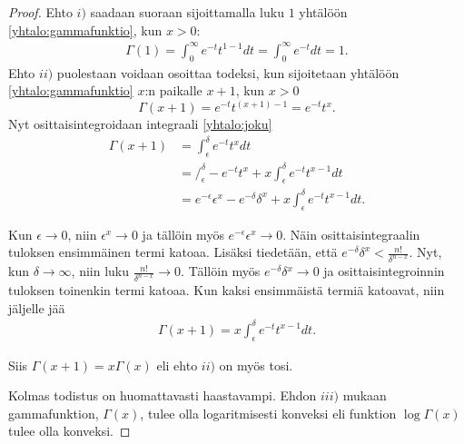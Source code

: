 \documentclass[12pt]{article}
\theoremstyle{definition}
\theoremstyle{plain}
\numberwithin{equation}{section}
\begin{document}
\begin{proof}
Ehto $i)$ saadaan suoraan sijoittamalla luku $1$ yhtälöön \eqref{yhtalo:gammafunktio}, kun $x>0$:
\begin{align*}
    \Gamma(1) = \int_0^\infty e^{-t}t^{1-1} dt = \int_0^\infty e^{-t}dt = 1.
\end{align*}
Ehto $ii)$ puolestaan voidaan osoittaa todeksi, kun sijoitetaan yhtälöön \eqref{yhtalo:gammafunktio} $x$:n paikalle $x+1$, kun $x>0$
\begin{equation}\label{yhtalo:joku}
    \Gamma(x+1)=e^{-t}t^{(x+1)-1} = e^{-t}t^{x}.
\end{equation}
Nyt osittaisintegroidaan integraali \eqref{yhtalo:joku}
\begin{align*}
    \Gamma(x+1) & = \int_{\epsilon}^{\delta} e^{-t} t^{x} dt \\
    & = \Big/_\epsilon^\delta -e^{-t}t^{x}+x\int_\epsilon^\delta e^{-t}t^{x-1}dt \\
    & = e^{-\epsilon}\epsilon^{x}-e^{-\delta}\delta^{x}+x\int_\epsilon^\delta e^{-t}t^{x-1}dt.
\end{align*}

Kun $\epsilon\rightarrow0$, niin $\epsilon^x\rightarrow0$ ja tällöin myös $e^{-\epsilon}\epsilon^x \rightarrow0$. Näin osittaisintegraalin tuloksen ensimmäinen termi katoaa. Lisäksi tiedetään, että $e^{-\delta}\delta^{x} < \frac{n!}{\delta^{n-x}}$. Nyt, kun $\delta\rightarrow\infty$, niin luku $\frac{n!}{\delta^{n-x}}\rightarrow0.$ Tällöin myös $e^{-\delta}\delta{^x}\rightarrow0$ ja osittaisintegroinnin tuloksen toinenkin termi katoaa. Kun kaksi ensimmäistä termiä katoavat, niin jäljelle jää 
\begin{align*}
   \Gamma(x+1)=x\int_\epsilon^\delta e^{-t}t^{x-1}dt.
\end{align*}

Siis $\Gamma(x+1) = x\Gamma(x)$ eli ehto $ii)$ on myös tosi.

Kolmas todistus on huomattavasti haastavampi. Ehdon $iii)$ mukaan gammafunktion, $\Gamma(x)$, tulee olla logaritmisesti konveksi eli funktion $\log\Gamma(x)$ tulee olla konveksi.


\end{proof}
\end{document}
